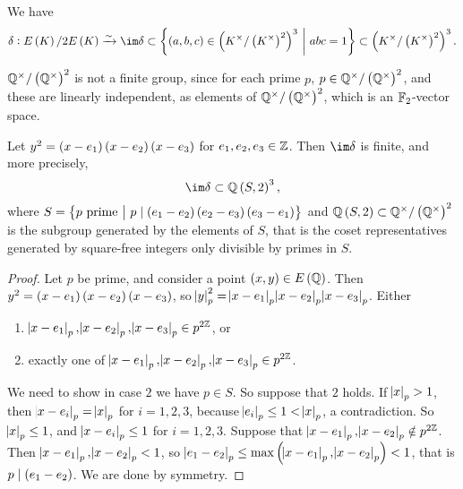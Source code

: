 \begin{remark}
We have
$$ \delta : E\br{K} / 2E\br{K} \xrightarrow{\sim} \im \delta \subset \cbr{\br{a, b, c} \in \br{K^\times / \br{K^\times}^2}^3 \st abc = 1} \subset \br{K^\times / \br{K^\times}^2}^3. $$
\end{remark}

\begin{example*}
$ \QQ^\times / \br{\QQ^\times}^2 $ is not a finite group, since for each prime $ p $, $ p \in \QQ^\times / \br{\QQ^\times}^2 $, and these are linearly independent, as elements of $ \QQ^\times / \br{\QQ^\times}^2 $, which is an $ \mathbb{F}_2 $-vector space.
\end{example*}


\begin{proposition}
Let $ y^2 = \br{x - e_1}\br{x - e_2}\br{x - e_3} $ for $ e_1, e_2, e_3 \in \mathbb{Z} $. Then $ \im \delta $ is finite, and more precisely,
$$ \im \delta \subset \QQ\br{S, 2}^3, $$
where $ S = \cbr{p \ \text{prime} \st p \mid \br{e_1 - e_2}\br{e_2 - e_3}\br{e_3 - e_1}} $ and $ \QQ\br{S, 2} \subset \QQ^\times / \br{\QQ^\times}^2 $ is the subgroup generated by the elements of $ S $, that is the coset representatives generated by square-free integers only divisible by primes in $ S $.
\end{proposition}

\begin{proof}
Let $ p $ be prime, and consider a point $ \br{x, y} \in E\br{\QQ} $. Then $ y^2 = \br{x - e_1}\br{x - e_2}\br{x - e_3} $, so $ \abs{y}_p^2 = \abs{x - e_1}_p\abs{x - e_2}_p\abs{x - e_3}_p $. Either
\begin{enumerate}
\item $ \abs{x - e_1}_p, \abs{x - e_2}_p, \abs{x - e_3}_p \in p^{2\mathbb{Z}} $, or
\item exactly one of $ \abs{x - e_1}_p, \abs{x - e_2}_p, \abs{x - e_3}_p \in p^{2\mathbb{Z}} $.
\end{enumerate}
We need to show in case $ 2 $ we have $ p \in S $. So suppose that $ 2 $ holds. If $ \abs{x}_p > 1 $, then $ \abs{x - e_i}_p = \abs{x}_p $ for $ i = 1, 2, 3 $, because $ \abs{e_i}_p \le 1 < \abs{x}_p $, a contradiction. So $ \abs{x}_p \le 1 $, and $ \abs{x - e_i}_p \le 1 $ for $ i = 1, 2, 3 $. Suppose that $ \abs{x - e_1}_p, \abs{x - e_2}_p \notin p^{2\mathbb{Z}} $. Then $ \abs{x - e_1}_p, \abs{x - e_2}_p < 1 $, so $ \abs{e_1 - e_2}_p \le \max\br{\abs{x - e_1}_p, \abs{x - e_2}_p} < 1 $, that is $ p \mid \br{e_1 - e_2} $. We are done by symmetry.
\end{proof}

